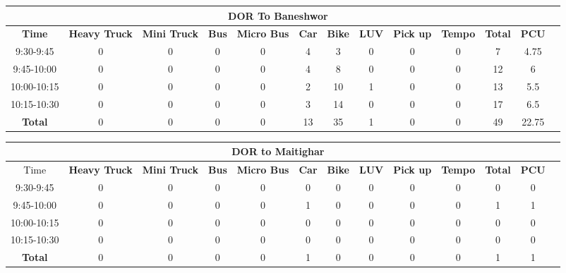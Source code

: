 \begin{landscape}
\centering
\begin{table}[h!]
\centering
\begin{tabular}{|c|c|c|c|c|c|c|c|c|c|c|c|c|}
    \hline
    \multicolumn{12}{|c|}{\textbf{DOR To Baneshwor}} \\
    \hline
    \textbf{Time} & \textbf{Heavy Truck} & \textbf{Mini Truck} & \textbf{Bus} & \textbf{Micro Bus} & \textbf{Car} & \textbf{Bike} & \textbf{LUV} & \textbf{Pick up} & \textbf{Tempo} & \textbf{\textbf{Total}} & \textbf{PCU} \\
    \hline
9:30-9:45	&0	&0	&0	&0	&4	&3	&0	&0	&0	&7	&4.75 \\ \hline
9:45-10:00	&0	&0	&0	&0	&4	&8	&0	&0	&0	&12	&6 \\ \hline
10:00-10:15	&0	&0	&0	&0	&2	&10	&1	&0	&0	&13	&5.5 \\ \hline
10:15-10:30	&0	&0	&0	&0	&3	&14	&0	&0	&0	&17	&6.5 \\ \hline
\textbf{Total}	&0	&0	&0	&0	&13	&35	&1	&0	&0	&49	&22.75 \\ \hline

\end{tabular}

\vspace{0.5cm}

\begin{tabular}{|c|c|c|c|c|c|c|c|c|c|c|c|c|}
    \hline
    \multicolumn{12}{|c|}{\textbf{DOR to Maitighar}} \\
    \hline
        Time & \textbf{Heavy Truck} & \textbf{Mini Truck} & \textbf{Bus} & \textbf{Micro Bus} & \textbf{Car} & \textbf{Bike} & \textbf{LUV} & \textbf{Pick up} & \textbf{Tempo} & \textbf{\textbf{Total}} & \textbf{PCU} \\
    \hline
9:30-9:45	&0	&0	&0	&0	&0	&0	&0	&0	&0	&0	&0 \\ \hline
9:45-10:00	&0	&0	&0	&0	&1	&0	&0	&0	&0	&1	&1 \\ \hline
10:00-10:15	&0	&0	&0	&0	&0	&0	&0	&0	&0	&0	&0 \\ \hline
10:15-10:30	&0	&0	&0	&0	&0	&0	&0	&0	&0	&0	&0 \\ \hline
\textbf{Total}	&0	&0	&0	&0	&1	&0	&0	&0	&0	&1	&1 \\ \hline

\end{tabular}


\end{table}
\end{landscape}

